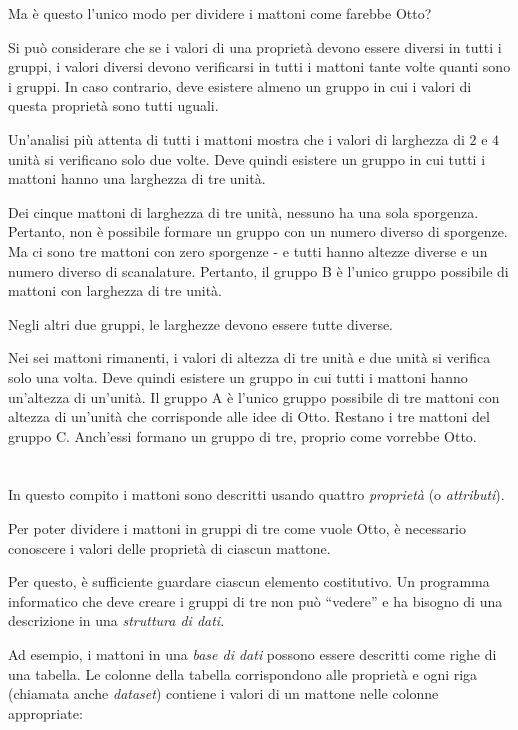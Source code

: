 {{{\par}

Ma è questo l’unico modo per dividere i mattoni come farebbe Otto?

Si può considerare che se i valori di una proprietà devono essere diversi in tutti i gruppi, i valori diversi devono verificarsi in tutti i mattoni tante volte quanti sono i gruppi. In caso contrario, deve esistere almeno un gruppo in cui i valori di questa proprietà sono tutti uguali.

Un’analisi più attenta di tutti i mattoni mostra che i valori di larghezza di $2$ e $4$ unità si verificano solo due volte. Deve quindi esistere un gruppo in cui tutti i mattoni hanno una larghezza di tre unità.

Dei cinque mattoni di larghezza di tre unità, nessuno ha una sola sporgenza. Pertanto, non è possibile formare un gruppo con un numero diverso di sporgenze. Ma ci sono tre mattoni con zero sporgenze - e tutti hanno altezze diverse e un numero diverso di scanalature. Pertanto, il gruppo B è l’unico gruppo possibile di mattoni con larghezza di tre unità.

Negli altri due gruppi, le larghezze devono essere tutte diverse.

Nei sei mattoni rimanenti, i valori di altezza di tre unità e due unità si verifica solo una volta. Deve quindi esistere un gruppo in cui tutti i mattoni hanno un’altezza di un’unità. Il gruppo A è l’unico gruppo possibile di tre mattoni con altezza di un’unità che corrisponde alle idee di Otto. Restano i tre mattoni del gruppo C. Anch’essi formano un gruppo di tre, proprio come vorrebbe Otto.



\section*{\BrochureItsInformatics}
In questo compito i mattoni sono descritti usando quattro \emph{proprietà} (o \emph{attributi}).

Per poter dividere i mattoni in gruppi di tre come vuole Otto, è necessario conoscere i valori delle proprietà di ciascun mattone.

Per questo, è sufficiente guardare ciascun elemento costitutivo. Un programma informatico che deve creare i gruppi di tre non può \enquote{vedere} e ha bisogno di una descrizione in una \emph{struttura di dati}.

Ad esempio, i mattoni in una \emph{base di dati} possono essere descritti come righe di una tabella. Le colonne della tabella corrispondono alle proprietà e ogni riga (chiamata anche \emph{dataset}) contiene i valori di un mattone nelle colonne appropriate:

}}
